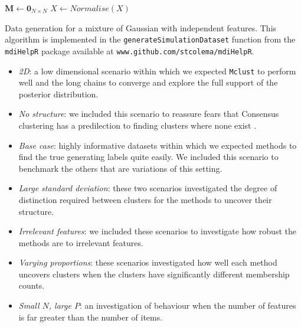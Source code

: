 \documentclass[]{article}
\begin{document}
\begin{algorithm}
{		$\mathbf{M} \leftarrow \mathbf{0}_{N \times N}$\;
		$X \leftarrow Normalise(X)$
	}
	\caption{Data generation for a mixture of Gaussian with independent features. This algorithm is implemented in the \texttt{generateSimulationDataset} function from the \texttt{mdiHelpR} package available at \texttt{www.github.com/stcolema/mdiHelpR}.}
\end{algorithm}

\begin{itemize}
	\item \emph{2D}: a low dimensional scenario within which we expected \texttt{Mclust} to perform well and the long chains to converge and explore the full support of the posterior distribution.
	\item \emph{No structure}: we included this scenario to reassure fears that Consensus clustering has a predilection to finding clusters where none exist \citep{senbabaoglu2014reassessment,senbabaouglu2014critical}.
	\item \emph{Base case}: highly informative datasets within which we expected methods to find the true generating labels quite easily. We included this scenario to benchmark the others that are variations of this setting.
	\item \emph{Large standard deviation}: these two scenarios investigated the degree of distinction required between clusters for the methods to uncover their structure.
	\item \emph{Irrelevant features}: we included these scenarios to investigate how robust the methods are to irrelevant features.
	\item \emph{Varying proportions}: these scenarios investigated how well each method uncovers clusters when the clusters have significantly different membership counts.
	\item \emph{Small $N$, large $P$}: an investigation of behaviour when the number of features is far greater than the number of items.
\end{itemize}
\end{document}
